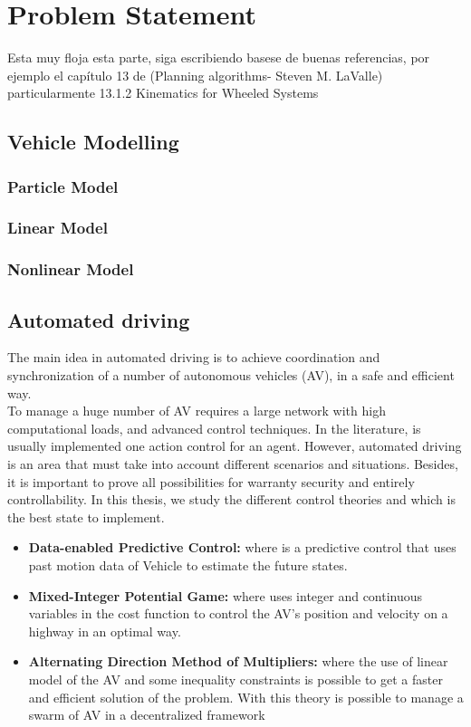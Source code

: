 \chapter{Problem Statement}




{\color{red} Esta muy floja esta parte, siga escribiendo basese de buenas referencias, por ejemplo el capítulo 13 de (Planning algorithms- Steven M. LaValle) particularmente 13.1.2 Kinematics for Wheeled Systems }







\section{Vehicle Modelling}


\subsection{Particle Model}
\subsection{Linear Model}
\subsection{Nonlinear Model}



\section{Automated driving}
The main idea in automated driving is to achieve coordination and synchronization of a number of autonomous vehicles (AV), in a safe and efficient way.\\

To manage a huge number of  AV requires a large network with high computational loads, and advanced control techniques. In the literature, is usually implemented one action control for an agent. However, automated driving is an area that must take into account different scenarios and situations. Besides, it is important to prove all possibilities for warranty security and entirely controllability. In this thesis, we study the different control theories and which is the best state to implement. 
\begin{itemize}
    \item  \textbf{Data-enabled Predictive Control:} where is a predictive control that uses past motion data of Vehicle to estimate the future states.
    \item  \textbf{Mixed-Integer Potential Game:} where uses integer and continuous variables in the cost function to control the AV's position and velocity on a highway in an optimal way.
    \item  \textbf{Alternating Direction Method of Multipliers:} where the use of linear model of the AV and some inequality constraints is possible to get a faster and efficient solution of the problem. With this theory is possible to manage a swarm of AV in a decentralized framework
\end{itemize}

